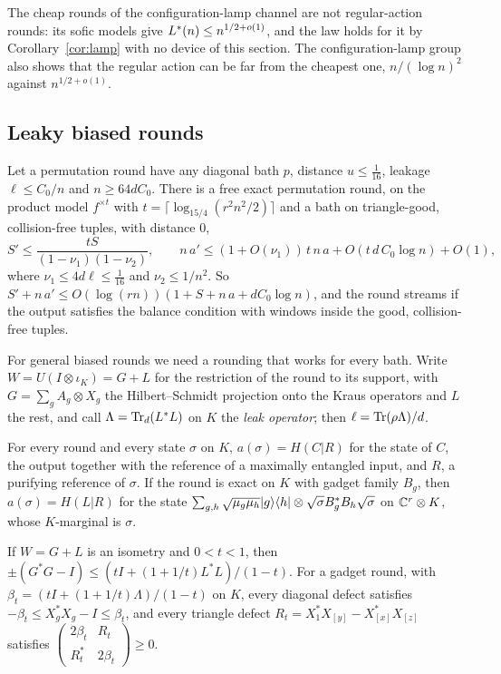 The cheap rounds of the configuration-lamp channel are not regular-action rounds: its sofic models give $L^{*}(n)\le n^{1/2+o(1)}$, and the law holds for it by
Corollary~\ref{cor:lamp} with no device of this section. The configuration-lamp group also shows that the regular action can be far from the cheapest one,
$n/(\log n)^2$ against $n^{1/2+o(1)}$.

\subsection{Leaky biased rounds}

\begin{theorem}\label{thm:perm-leaky}
Let a permutation round have any diagonal bath $p$, distance $u\le\frac1{16}$, leakage $\ell\le C_0/n$ and $n\ge64dC_0$. There is a free exact
permutation round, on the product model $f^{\times t}$ with $t=\lceil\log_{15/4}(r^2n^2/2)\rceil$ and a bath on triangle-good, collision-free
tuples, with distance $0$,
\[
S'\le\frac{tS}{(1-\nu_1)(1-\nu_2)},\qquad n\,a'\le(1+O(\nu_1))\,t\,n\,a+O(t\,d\,C_0\log n)+O(1),
\]
where $\nu_1\le4d\ell\le\frac1{16}$ and $\nu_2\le1/n^2$. So $S'+n\,a'\le O(\log(rn))(1+S+n\,a+dC_0\log n)$, and the round streams if the output
satisfies the balance condition with windows inside the good, collision-free tuples.
\end{theorem}

For general biased rounds we need a rounding that works for every bath. Write $W=U(I\otimes\iota_K)=G+L$ for the restriction of the round to its
support, with $G=\sum_gA_g\otimes X_g$ the Hilbert--Schmidt projection onto the Kraus operators and $L$ the rest, and call $\Lambda=\operatorname{Tr}_d(L^*L)$ on $K$ the
\emph{leak operator}; then $\ell=\operatorname{Tr}(\rho\Lambda)/d$.

\begin{lemma}\label{lem:conditional}
For every round and every state $\sigma$ on $K$, $a(\sigma)=H(C|R)$ for the state of $C$, the output together with the reference of a maximally
entangled input, and $R$, a purifying reference of $\sigma$. If the round is exact on $K$ with gadget family $B_g$, then $a(\sigma)=H(L|R)$ for the
state $\sum_{g,h}\sqrt{\mu_g\mu_h}\lvert g\rangle\langle h\rvert\otimes\sqrt\sigma B_g^*B_h\sqrt\sigma$ on $\mathbb C^r\otimes K$, whose $K$-marginal is $\sigma$.
\end{lemma}

\begin{lemma}\label{lem:domination}
If $W=G+L$ is an isometry and $0<t<1$, then $\pm(G^*G-I)\le(tI+(1+1/t)L^*L)/(1-t)$. For a gadget round, with $\beta_t=(tI+(1+1/t)\Lambda)/(1-t)$ on $K$,
every diagonal defect satisfies $-\beta_t\le X_g^*X_g-I\le\beta_t$, and every triangle defect $R_t=X_1^*X_{[y]}-X_{[x]}^*X_{[z]}$ satisfies
$\left(\begin{smallmatrix}2\beta_t&R_t\\R_t^*&2\beta_t\end{smallmatrix}\right)\ge0$.
\end{lemma}

